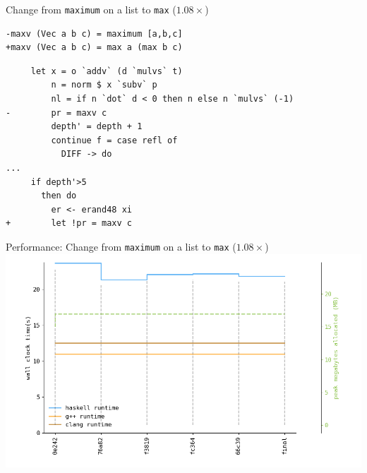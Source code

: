 \documentclass[8pt]{beamer}
\begin{document}
\begin{frame}[fragile]{ Change from \texttt{maximum} on a list to \texttt{max} ($1.08\times$)}
\begin{verbatim}
-maxv (Vec a b c) = maximum [a,b,c]
+maxv (Vec a b c) = max a (max b c)
\end{verbatim}

\begin{verbatim}
     let x = o `addv` (d `mulvs` t)
         n = norm $ x `subv` p
         nl = if n `dot` d < 0 then n else n `mulvs` (-1)
-        pr = maxv c
         depth' = depth + 1
         continue f = case refl of
           DIFF -> do
...
     if depth'>5
       then do
         er <- erand48 xi
+        let !pr = maxv c
\end{verbatim}

\end{frame}

\begin{frame}[fragile]{Performance: Change from \texttt{maximum} on a list to \texttt{max}  ($1.08\times$)}
\includegraphics[height=0.6\textwidth]{perfdata-upto-66c39-gen.png}
\end{frame}
\end{document}
